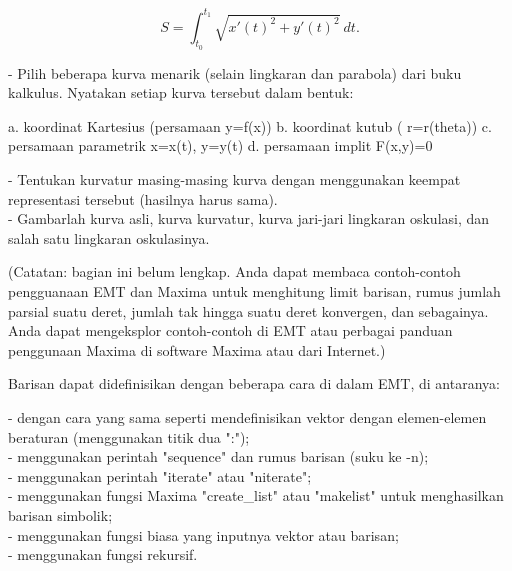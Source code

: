 \documentclass[a4paper,10pt]{article}
\begin{document}
\begin{eulernotebook}
\begin{eulercomment}
\begin{eulercomment}
\begin{eulercomment}
\begin{eulercomment}
\begin{eulercomment}
\begin{eulercomment}
\begin{eulercomment}
\begin{eulercomment}
\begin{eulercomment}
\begin{eulercomment}
\begin{eulercomment}
\begin{eulercomment}
\begin{eulercomment}
\begin{eulercomment}
\begin{eulercomment}
\begin{eulercomment}
\begin{eulercomment}
\begin{eulercomment}
\begin{eulercomment}
\begin{eulercomment}
\begin{eulercomment}
\end{eulercomment}
\begin{eulerformula}
\[
S=\int_{t_0}^{t_1} \sqrt{x'(t)^2+y'(t)^2}\ dt.
\]
\end{eulerformula}
\begin{eulercomment}
- Pilih beberapa kurva menarik (selain lingkaran dan parabola) dari buku  kalkulus. Nyatakan setiap kurva tersebut dalam bentuk:\\
\end{eulercomment}
\begin{eulerttcomment}
  a. koordinat Kartesius (persamaan y=f(x))
  b. koordinat kutub ( r=r(theta))
  c. persamaan parametrik x=x(t), y=y(t)
  d. persamaan implit F(x,y)=0
\end{eulerttcomment}
\begin{eulercomment}
- Tentukan kurvatur masing-masing kurva dengan menggunakan keempat representasi tersebut (hasilnya harus sama).\\
- Gambarlah kurva asli, kurva kurvatur, kurva jari-jari lingkaran oskulasi, dan salah satu lingkaran oskulasinya.
\end{eulercomment}
\begin{eulercomment}
(Catatan: bagian ini belum lengkap. Anda dapat membaca contoh-contoh pengguanaan EMT dan
Maxima untuk menghitung limit barisan, rumus jumlah parsial suatu deret, jumlah tak hingga
suatu deret konvergen, dan sebagainya. Anda dapat mengeksplor contoh-contoh di EMT atau
perbagai panduan penggunaan Maxima di software Maxima atau dari Internet.)

Barisan dapat didefinisikan dengan beberapa cara di dalam EMT, di antaranya:

- dengan cara yang sama seperti mendefinisikan vektor dengan elemen-elemen beraturan
(menggunakan titik dua ":");\\
- menggunakan perintah "sequence" dan rumus barisan (suku ke -n);\\
- menggunakan perintah "iterate" atau "niterate";\\
- menggunakan fungsi Maxima "create\_list" atau "makelist" untuk menghasilkan barisan
simbolik;\\
- menggunakan fungsi biasa yang inputnya vektor atau barisan;\\
- menggunakan fungsi rekursif.


\end{eulercomment}
\end{eulercomment}
\end{eulercomment}
\end{eulercomment}
\end{eulercomment}
\end{eulercomment}
\end{eulercomment}
\end{eulercomment}
\end{eulercomment}
\end{eulercomment}
\end{eulercomment}
\end{eulercomment}
\end{eulercomment}
\end{eulercomment}
\end{eulercomment}
\end{eulercomment}
\end{eulercomment}
\end{eulercomment}
\end{eulercomment}
\end{eulercomment}
\end{eulercomment}
\end{eulernotebook}
\end{document}
